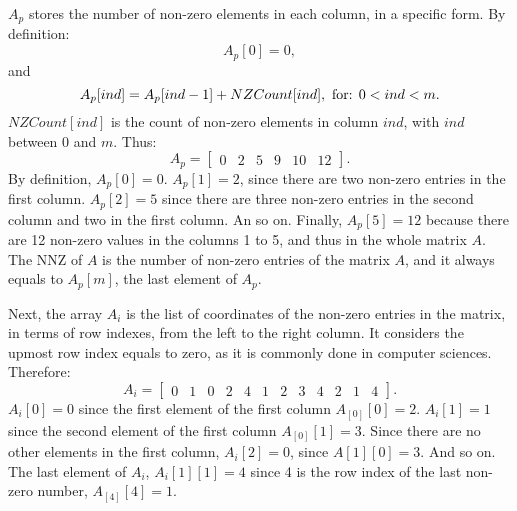 $A_p$ stores the number of non-zero elements in each column, in a specific form. By definition:
%
\begin{equation}
	A_p[0] = 0,
\end{equation}
%
and
%
%
\begin{equation}
	A_p[ind] = A_p[ind - 1] + NZCount[ind], \textnormal{ for: } 0 < ind < m.
\end{equation}
%
$NZCount[ind]$ is the count of non-zero elements in column $ind$, with $ind$ between $0$ and $m$. Thus:
%
%
\begin{equation}
	A_p = 
	\begin{bmatrix}
		0	&2	&5	&9	&10	&12
	\end{bmatrix}
	.
\end{equation}
%
By definition, ${A_p}[0] = 0$. ${A_p}[1] = 2$, since there are two non-zero entries in the first column. 
%
${A_p}[2] = 5$ since there are three non-zero entries in the second column and two in the first column. 
%
An so on. 
%
Finally, ${A_p}[5] = 12$ because there are 12 non-zero values in the columns 1 to 5, and thus in the whole matrix $A$. 
%
The NNZ of $A$ is the number of non-zero entries of the matrix $A$, and it always equals to $A_p[m]$, the last element of $A_p$. 

Next, the array $A_i$ is the list of coordinates of the non-zero entries in the matrix, in terms of row indexes, from the left to the right column. 
%
It considers the upmost row index equals to zero, as it is commonly done in computer sciences. 
%
Therefore:
%
\begin{equation}
	A_i = 
	\begin{bmatrix}
		0	&1	&0	&2	&4	&1	&2	&3	&4	&2	&1	&4
	\end{bmatrix}
	.
\end{equation}
${A_i}[0] = 0$ since the first element of the first column $A_[0][0] = 2$. 
%
${A_i}[1] = 1$ since the second element of the first column $A_[0][1] = 3$. Since there are no other elements in the first column, ${A_i}[2] = 0$, since $A[1][0] = 3$. And so on. The last element of $A_i$, ${A_i}[1][1] = 4$ since 4 is the row index of the last non-zero number, $A_[4][4] = 1$.
	
